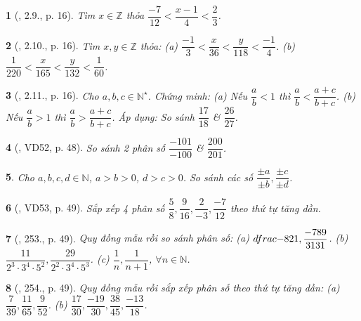 \documentclass{article}
\newtheorem{baitoan}{}
\begin{document}
\begin{baitoan}[\cite{Binh_boi_duong_Toan_6_tap_2}, 2.9., p. 16]
	Tìm $x\in\mathbb{Z}$ thỏa $\dfrac{-7}{12} < \dfrac{x - 1}{4} < \dfrac{2}{3}$.
\end{baitoan}

\begin{baitoan}[\cite{Binh_boi_duong_Toan_6_tap_2}, 2.10., p. 16]
	Tìm $x,y\in\mathbb{Z}$ thỏa: (a) $\dfrac{-1}{3} < \dfrac{x}{36} < \dfrac{y}{118} < \dfrac{-1}{4}$. (b) $\dfrac{1}{220} < \dfrac{x}{165} < \dfrac{y}{132} < \dfrac{1}{60}$.
\end{baitoan}

\begin{baitoan}[\cite{Binh_boi_duong_Toan_6_tap_2}, 2.11., p. 16]
	Cho $a,b,c\in\mathbb{N}^\star$. Chứng minh: (a) Nếu $\dfrac{a}{b} < 1$ thì $\dfrac{a}{b} < \dfrac{a + c}{b + c}$. (b) Nếu $\dfrac{a}{b} > 1$ thì $\dfrac{a}{b} > \dfrac{a + c}{b + c}$. Áp dụng: So sánh $\dfrac{17}{18}$ \& $\dfrac{26}{27}$.
\end{baitoan}

\begin{baitoan}[\cite{Tuyen_Toan_6}, VD52, p. 48]
	So sánh 2 phân số $\dfrac{-101}{-100}$ \& $\dfrac{200}{201}$.
\end{baitoan}

\begin{baitoan}
	Cho $a,b,c,d\in\mathbb{N}$, $a > b > 0$, $d > c > 0$. So sánh các số $\dfrac{\pm a}{\pm b},\dfrac{\pm c}{\pm d}$.
\end{baitoan}

\begin{baitoan}[\cite{Tuyen_Toan_6}, VD53, p. 49]
	Sắp xếp 4 phân số $\dfrac{5}{8},\dfrac{9}{16},\dfrac{2}{-3},\dfrac{-7}{12}$ theo thứ tự tăng dần.
\end{baitoan}

\begin{baitoan}[\cite{Tuyen_Toan_6}, 253., p. 49]
	Quy đồng mẫu rồi so sánh phân số: (a) $\\dfrac{-8}{21},\dfrac{-789}{3131}$. (b) $\dfrac{11}{2^3\cdot3^4\cdot5^2},\dfrac{29}{2^2\cdot3^4\cdot5^3}$. (c) $\dfrac{1}{n},\dfrac{1}{n + 1}$, $\forall n\in\mathbb{N}$.
\end{baitoan}

\begin{baitoan}[\cite{Tuyen_Toan_6}, 254., p. 49]
	Quy đồng mẫu rồi sắp xếp phân số theo thứ tự tăng dần: (a) $\dfrac{7}{39},\dfrac{11}{65},\dfrac{9}{52}$. (b) $\dfrac{17}{30},\dfrac{-19}{30},\dfrac{38}{45},\dfrac{-13}{18}$.
\end{baitoan}
\end{document}
